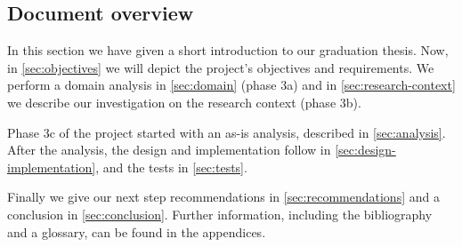 
\subsection{Document overview}
In this section we have given a short introduction to our graduation thesis.
Now, in \autoref{sec:objectives} we will depict the project's objectives and requirements.
We perform a domain analysis in \autoref{sec:domain} (phase 3a) and in \autoref{sec:research-context} we describe our investigation on the research context (phase 3b).

Phase 3c of the project started with an as-is analysis, described in \autoref{sec:analysis}.
After the analysis, the design and implementation follow in \autoref{sec:design-implementation}, and the tests in \autoref{sec:tests}.

Finally we give our next step recommendations in \autoref{sec:recommendations} and a conclusion in \autoref{sec:conclusion}.
Further information, including the bibliography and a glossary, can be found in the appendices.